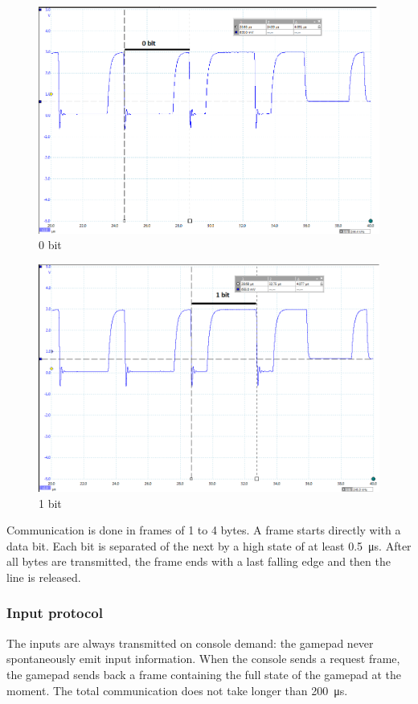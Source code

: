 \documentclass[a4paper,oneside,12pt]{article}
\begin{document}
\begin{figure}
  \includegraphics[width=\textwidth]{0bit.png}
  \caption{0 bit}
  \label{0bit}
\end{figure}

\begin{figure}
  \includegraphics[width=\textwidth]{1bit.png}
  \caption{1 bit}
  \label{1bit}
\end{figure}

Communication is done in frames of 1 to 4 bytes. A frame starts directly with a
data bit. Each bit is separated of the next by a high state of at least
\SI{0.5}{\us}. After all bytes are transmitted, the frame ends with a last
falling edge and then the line is released.

\subsubsection{Input protocol}
The inputs are always transmitted on console demand: the gamepad never
spontaneously emit input information. When the console sends a request frame,
the gamepad sends back a frame containing the full state of the gamepad at the
moment. The total communication does not take longer than \SI{200}{\us}.
\end{document}
